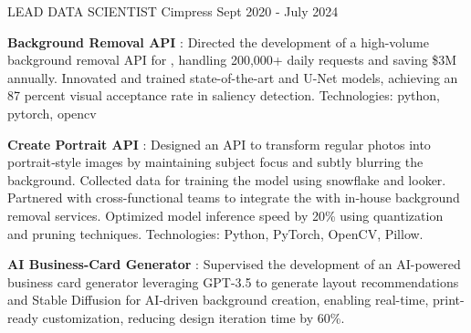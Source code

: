 
\begin{cventries}

    \cventry
    {LEAD DATA SCIENTIST} %
    {Cimpress} %
    {} %
    {Sept 2020 - July 2024} %
    {
      \begin{cvitems} %
      \item{\textbf{Background Removal API} : \newline 
      Directed the development of a high-volume background removal API for ,  
      handling 200,000+ daily requests and saving \$3M annually. \newline 
      Innovated and trained state-of-the-art  and 
      U-Net models, achieving an 87 percent visual acceptance rate in saliency 
      detection. \newline 
      Technologies: python, pytorch, opencv }
      \item{\textbf{Create Portrait API} : \newline
      Designed an API to transform regular photos into portrait‐style images by maintaining subject focus and subtly blurring the background.
      \newline
      Collected data for training the model using snowflake and looker. 
      \newline 
      Partnered with cross-functional teams to integrate the  with in‐house background removal services.
      \newline
      Optimized model inference speed by 20\% using quantization and pruning techniques.
      Technologies: Python, PyTorch, OpenCV, Pillow. }
      \item{\textbf{AI Business-Card Generator} : \newline
      Supervised the development of an AI-powered business card generator leveraging GPT-3.5 to generate layout recommendations and Stable Diffusion for AI-driven background creation, enabling real-time, print-ready customization, reducing design iteration time by 60\%. 
}
\end{cvitems}}
\end{cventries}
